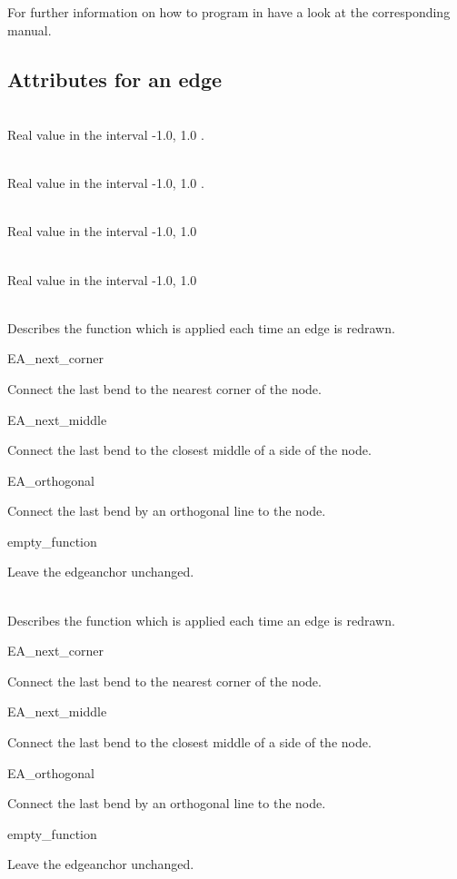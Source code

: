 \documentclass[twoside,fleqn]{report}
\begin{document}
For further information on how to program in \GraphScript{} have a look
at the corresponding manual.

\subsection{Attributes for an edge}

\begin{TclAttributes}

   \strut\\
  Real value in the interval -1.0, 1.0 .

   \strut\\
  Real value in the interval -1.0, 1.0 .

   \strut\\
  Real value in the interval -1.0, 1.0 

   \strut\\
  Real value in the interval -1.0, 1.0 

   \strut\\
  Describes the function which is applied each time an edge is redrawn. 
    \begin{ttdescription}
    \item[EA\_next\_corner] \strut 
      Connect the last bend to the nearest corner of the node.
    \item[EA\_next\_middle] \strut 
      Connect the last bend to the closest middle of a side of the node.
    \item[EA\_orthogonal] \strut
      Connect the last bend by an orthogonal line to the node.
    \item[empty\_function] \strut
      Leave the edgeanchor unchanged.
    \end{ttdescription}
  
   \strut\\
  Describes the function which is applied each time an edge is redrawn. 
  \begin{ttdescription}
    \item[EA\_next\_corner] \strut 
    Connect the last bend to the nearest corner of the node.
    \item[EA\_next\_middle] \strut 
      Connect the last bend to the closest middle of a side of the node.
    \item[EA\_orthogonal] \strut
      Connect the last bend by an orthogonal line to the node.
    \item[empty\_function] \strut
      Leave the edgeanchor unchanged.
    \end{ttdescription}
 
\end{TclAttributes}
\end{document}
